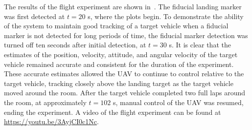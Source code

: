 

The results of the flight experiment are shown in~.
The fiducial landing marker was first detected at $t = 20$ s, where the plots
begin.
To demonstrate the ability of the
system to maintain good tracking of a target vehicle when a fiducial
marker is not detected for long periods of time, the fiducial marker detection
was turned off ten seconds after initial detection, at $t = 30$ s.
It is clear that the estimates of the position, velocity, attitude, and angular
velocity of the target vehicle remained accurate and consistent for the duration
of the experiment.
These accurate estimates allowed
the UAV to continue to control relative to the target vehicle, tracking closely
above the landing target as the target vehicle moved around the room. After the
target vehicle completed two full laps around the room,
at approximately $t=102$ s, manual control of the UAV was resumed, ending the experiment.
A video of the flight experiment can be found at
\url{https://youtu.be/3AyjCI0c1Nc}.

